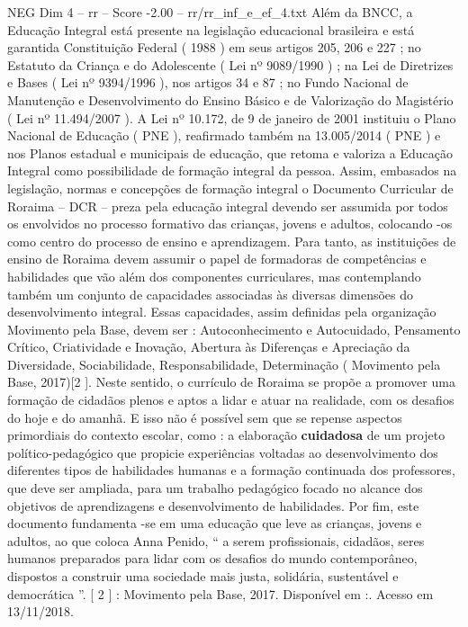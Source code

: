 \begin{textsample}{NEG Dim 4 – rr – Score -2.00 – rr/rr\_inf\_e\_ef\_4.txt}
Além da BNCC, a Educação Integral está presente na legislação educacional brasileira e está garantida Constituição Federal ( 1988 ) em seus artigos 205, 206 e 227 ; no Estatuto da Criança e do Adolescente ( Lei nº 9089/1990 ) ; na Lei de Diretrizes e Bases ( Lei nº 9394/1996 ), nos artigos 34 e 87 ; no Fundo Nacional de Manutenção e Desenvolvimento do Ensino Básico e de Valorização do Magistério ( Lei nº 11.494/2007 ).
A Lei nº 10.172, de 9 de janeiro de 2001 instituiu o Plano Nacional de Educação ( PNE ), reafirmado também na 13.005/2014 ( PNE ) e nos Planos estadual e municipais de educação, que retoma e valoriza a Educação Integral como possibilidade de formação integral da pessoa.
Assim, embasados na legislação, normas e concepções de formação integral o Documento Curricular de Roraima – DCR – preza pela educação integral devendo ser assumida por todos os envolvidos no processo formativo das crianças, jovens e adultos, colocando -os como centro do processo de ensino e aprendizagem.
Para tanto, as instituições de ensino de Roraima devem assumir o papel de formadoras de competências e habilidades que vão além dos componentes curriculares, mas contemplando também um conjunto de capacidades associadas às diversas dimensões do desenvolvimento integral.
Essas capacidades, assim definidas pela organização Movimento pela Base, devem ser : Autoconhecimento e Autocuidado, Pensamento Crítico, Criatividade e Inovação, Abertura às Diferenças e Apreciação da Diversidade, Sociabilidade, Responsabilidade, Determinação ( Movimento pela Base, 2017)[2 ].
Neste sentido, o currículo de Roraima se propõe a promover uma formação de cidadãos plenos e aptos a lidar e atuar na realidade, com os desafios do hoje e do amanhã.
E isso não é possível sem que se repense aspectos primordiais do contexto escolar, como : a elaboração \textbf{cuidadosa} de um projeto político-pedagógico que propicie experiências voltadas ao desenvolvimento dos diferentes tipos de habilidades humanas e a formação continuada dos professores, que deve ser ampliada, para um trabalho pedagógico focado no alcance dos objetivos de aprendizagens e desenvolvimento de habilidades.
Por fim, este documento fundamenta -se em uma educação que leve as crianças, jovens e adultos, ao que coloca Anna Penido, “ a serem profissionais, cidadãos, seres humanos preparados para lidar com os desafios do mundo contemporâneo, dispostos a construir uma sociedade mais justa, solidária, sustentável e democrática ”. [ 2 ] : Movimento pela Base, 2017.
Disponível em :.
Acesso em 13/11/2018.

\end{textsample}
